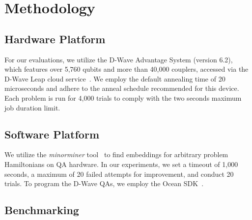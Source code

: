 \newpage
\section{Methodology}


\subsection{Hardware Platform}

For our evaluations, we utilize the D-Wave Advantage System (version 6.2), which features over 5,760 qubits and more than 40,000 couplers, accessed via the D-Wave Leap cloud service~\cite{D-Wave}.
We employ the default annealing time of 20 microseconds and adhere to the anneal schedule recommended for this device. 
Each problem is run for 4,000 trials to comply with the two seconds maximum job duration limit.


\subsection{Software Platform}

We utilize the \emph{minorminer} tool~\cite{minorminerGithub,cai2014practical} to find embeddings for arbitrary problem Hamiltonians on QA hardware. 
In our experiments, we set a timeout of 1,000 seconds, a maximum of 20 failed attempts for improvement, and conduct 20 trials. 
To program the D-Wave QAs, we employ the Ocean SDK~\cite{dwave_ocean_github}.


\subsection{Benchmarking}

